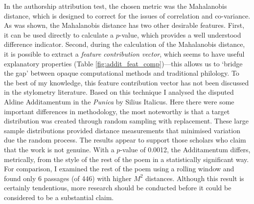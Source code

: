 \documentclass[11pt,a4paper]{scrartcl} %
\begin{document}
{In the authorship attribution test, the chosen metric was the Mahalanobis distance, which is designed to correct for the issues of correlation and co-variance. As was shown, the Mahalanobis distance has two other desirable features. First, it can be used directly to calculate a $p$-value, which provides a well understood difference indicator. Second, during the calculation of the Mahalanobis distance, it is possible to extract a \textit{feature contribution vector}, which seems to have useful explanatory properties (Table \ref{fig:addit_feat_comp})---this allows us to `bridge the gap' between opaque computational methods and traditional philology. To the best of my knowledge, this feature contribution vector has not been discussed in the stylometry literature. Based on this technique I analysed the disputed Aldine Additamentum in the \textit{Punica} by Silius Italicus. Here there were some important differences in methodology, the most noteworthy is that a target distribution was created through random sampling with replacement. These large sample distributions provided distance measurements that minimised variation due the random process. The results appear to support those scholars who claim that the work is not genuine. With a $p$-value of 0.0012, the Additamentum differs, metrically, from the style of the rest of the poem in a statistically significant way. For comparison, I examined the rest of the poem using a rolling window and found only 6 passages (of 446) with higher $M^{2}$ distances. Although this result is certainly tendentious, more research should be conducted before it could be considered to be a substantial claim.
\newpage
}
\end{document}
